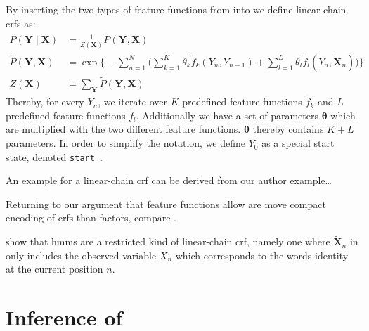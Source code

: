 By inserting the two types of \glspl{feature function} from  into  we define \glspl{linear-chain crf} as:
\begin{equation}
  \label{equ:linear-chain-crf-log-linear}
  \begin{split}
    P(\bm{Y}\mid\bm{X}) & = \frac{1}{Z(\bm{X})}\tilde{P}(\bm{Y},\bm{X})  \\
    \tilde{P}(\bm{Y},\bm{X}) & = \exp\Bigg\{ -\sum_{n=1}^N \Big(\sum_{k=1}^K\theta_k \tilde{f}_k(Y_n,Y_{n-1})+\sum_{l=1}^L\theta_l \tilde{f}_l(Y_n,\bm{\tilde{X}}_n)\Big) \Bigg\} \\
    Z(\bm{X}) & = \sum_{\bm{Y}}\tilde{P}(\bm{Y},\bm{X})
  \end{split}
\end{equation}
Thereby, for every $Y_n$, we iterate over $K$ predefined \glspl{feature function} $\tilde{f}_k$ and $L$ predefined \glspl{feature function} $\tilde{f}_l$.
Additionally we have a set of parameters $\bm{\theta}$ which are multiplied with the two different feature functions.
$\bm{\theta}$ thereby contains $K+L$ parameters.
In order to simplify the notation, we define $Y_0$ as a special start state, denoted \texttt{start}~\citep{lafferty2001conditional}.

An example for a  \gls{linear-chain crf} can be derived from our author example\dots{}

Returning to our argument that \glspl{feature function} allow are move compact encoding of \glspl{crf} than \glspl{factor}, compare .

\citet{sutton2010introduction} show that \glspl{hmm} are a restricted kind of \gls{linear-chain crf}, namely one where $\bm{\tilde{X}}_n$ in  only includes the \gls{observed variable} $X_n$ which corresponds to the words identity at the current position $n$.

\section{Inference of }\label{sec:inference-crfs}

